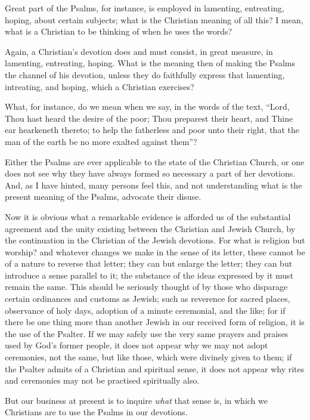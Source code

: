 Great part of the Psalms, for instance, is employed in lamenting,
entreating, hoping, about certain subjects; what is the Christian
meaning of all this? I mean, what is a Christian to be thinking of
when he uses the words?

Again, a Christian's devotion does and must consist, in great
measure, in lamenting, entreating, hoping. What is the meaning then of
making the Psalms the channel of his devotion, unless they do
faithfully express that lamenting, intreating, and hoping, which a
Christian exercises?

What, for instance, do we mean when we say, in the words of the
text, ``Lord, Thou hast heard the desire of the poor; Thou
preparest their heart, and Thine ear hearkeneth thereto; to help the
fatherless and poor unto their right, that the man of the earth be no
more exalted against them''?

Either the Psalms are ever applicable to the state of the Christian
Church, or one does not see why they have always formed so necessary a
part of her devotions. And, as I have hinted, many persons feel this,
and not understanding what is the present meaning of the Psalms,
advocate their disuse.

Now it is obvious what a remarkable evidence is afforded us of the
substantial agreement and the unity existing between the Christian and
Jewish Church, by the continuation in the Christian of the Jewish
devotions. For what is religion but worship? and whatever changes we
make in the sense of its letter, these cannot be of a nature to
reverse that letter; they can but enlarge the letter; they can but
introduce a sense parallel to it; the substance of the ideas expressed
by it must remain the same. This should be seriously thought of by
those who disparage certain ordinances and customs as Jewish; such as
reverence for sacred places, observance of holy days, adoption of a
minute ceremonial, and the like; for if there be one thing more than
another Jewish in our received form of religion, it is the use of the
Psalter. If we may safely use the very same prayers and praises used
by God's former people, it does not appear why we may not adopt
ceremonies, not the same, but like those, which were divinely given to
them; if the Psalter admits of a Christian and spiritual sense, it
does not appear why rites and ceremonies may not be practised
spiritually also.

But our business at present is to inquire \emph{what} that sense
is, in which we Christians are to use the Psalms in our devotions.

